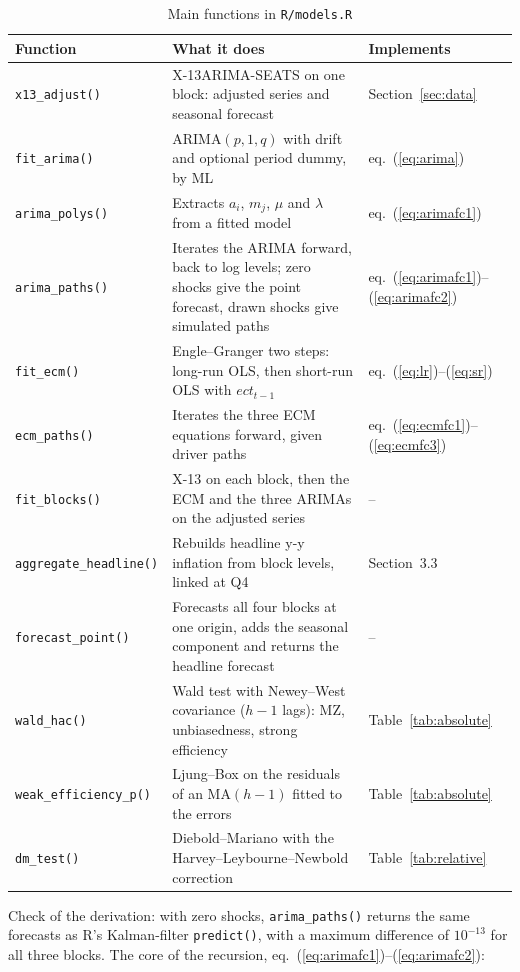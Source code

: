 \documentclass[11pt,a4paper]{article}
\begin{document}
\begin{table}[h]
  \centering\small
  \caption{Main functions in \texttt{R/models.R}}\label{tab:functions}
  \begin{tabular}{@{}lp{}l@{}}
    \toprule
    Function & What it does & Implements \\
    \midrule
    \texttt{x13\_adjust()} & X-13ARIMA-SEATS on one block: adjusted series and seasonal forecast & Section~\ref{sec:data} \\
    \texttt{fit\_arima()} & ARIMA$(p,1,q)$ with drift and optional period dummy, by ML & eq.~(\ref{eq:arima}) \\
    \texttt{arima\_polys()} & Extracts $a_i$, $m_j$, $\mu$ and $\lambda$ from a fitted model & eq.~(\ref{eq:arimafc1}) \\
    \texttt{arima\_paths()} & Iterates the ARIMA forward, back to log levels; zero shocks give the point forecast, drawn shocks give simulated paths & eq.~(\ref{eq:arimafc1})--(\ref{eq:arimafc2}) \\
    \texttt{fit\_ecm()} & Engle--Granger two steps: long-run OLS, then short-run OLS with $ect_{t-1}$ & eq.~(\ref{eq:lr})--(\ref{eq:sr}) \\
    \texttt{ecm\_paths()} & Iterates the three ECM equations forward, given driver paths & eq.~(\ref{eq:ecmfc1})--(\ref{eq:ecmfc3}) \\
    \texttt{fit\_blocks()} & X-13 on each block, then the ECM and the three ARIMAs on the adjusted series & -- \\
    \texttt{aggregate\_headline()} & Rebuilds headline y-y inflation from block levels, linked at Q4 & Section~3.3 \\
    \texttt{forecast\_point()} & Forecasts all four blocks at one origin, adds the seasonal component and returns the headline forecast & -- \\
    \texttt{wald\_hac()} & Wald test with Newey--West covariance ($h-1$ lags): MZ, unbiasedness, strong efficiency & Table~\ref{tab:absolute} \\
    \texttt{weak\_efficiency\_p()} & Ljung--Box on the residuals of an MA$(h-1)$ fitted to the errors & Table~\ref{tab:absolute} \\
    \texttt{dm\_test()} & Diebold--Mariano with the Harvey--Leybourne--Newbold correction & Table~\ref{tab:relative} \\
    \bottomrule
  \end{tabular}
\end{table}

Check of the derivation: with zero shocks, \texttt{arima\_paths()} returns the same forecasts as R's
Kalman-filter \texttt{predict()}, with a maximum difference of $10^{-13}$ for all three blocks. The core
of the recursion, eq.~(\ref{eq:arimafc1})--(\ref{eq:arimafc2}):
\end{document}
